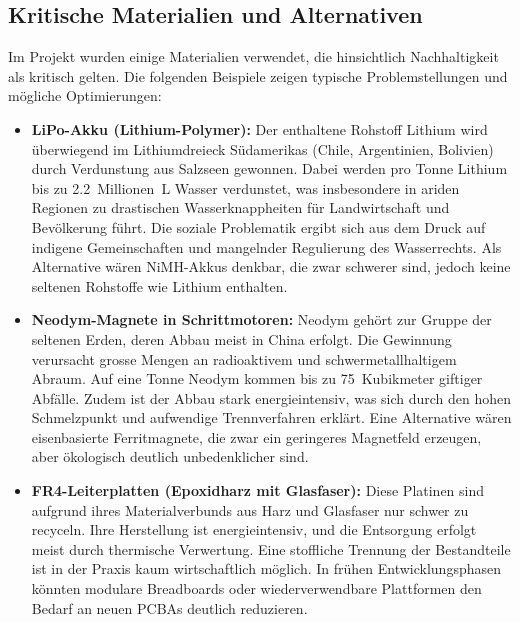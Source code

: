 \documentclass[main.tex]{subfiles} %
\begin{document}

\subsection{Kritische Materialien und Alternativen}

Im Projekt wurden einige Materialien verwendet, die hinsichtlich Nachhaltigkeit 
als kritisch gelten. Die folgenden Beispiele zeigen typische Problemstellungen 
und mögliche Optimierungen:

\begin{itemize}
    \item \textbf{LiPo-Akku (Lithium-Polymer):} 
    Der enthaltene Rohstoff Lithium wird überwiegend im Lithiumdreieck Südamerikas 
    (Chile, Argentinien, Bolivien) durch Verdunstung aus Salzseen gewonnen. Dabei 
    werden pro Tonne Lithium bis zu \SI{2.2}{Millionen\liter} Wasser verdunstet, 
    was insbesondere in ariden Regionen zu drastischen Wasserknappheiten für 
    Landwirtschaft und Bevölkerung führt. Die soziale Problematik ergibt sich aus 
    dem Druck auf indigene Gemeinschaften und mangelnder Regulierung des Wasserrechts. 
    Als Alternative wären NiMH-Akkus denkbar, die zwar schwerer sind, jedoch keine 
    seltenen Rohstoffe wie Lithium enthalten.
    
    \item \textbf{Neodym-Magnete in Schrittmotoren:} 
    Neodym gehört zur Gruppe der seltenen Erden, deren Abbau meist in China erfolgt. 
    Die Gewinnung verursacht grosse Mengen an radioaktivem und schwermetallhaltigem Abraum.
    Auf eine Tonne Neodym kommen bis zu \SI{75}{Kubikmeter} giftiger Abfälle. Zudem ist 
    der Abbau stark energieintensiv, was sich durch den hohen Schmelzpunkt und aufwendige 
    Trennverfahren erklärt. Eine Alternative wären eisenbasierte Ferritmagnete, die zwar 
    ein geringeres Magnetfeld erzeugen, aber ökologisch deutlich unbedenklicher sind.
    
    \item \textbf{FR4-Leiterplatten (Epoxidharz mit Glasfaser):} 
    Diese Platinen sind aufgrund ihres Materialverbunds aus Harz und Glasfaser nur 
    schwer zu recyceln. Ihre Herstellung ist energieintensiv, und die Entsorgung erfolgt 
    meist durch thermische Verwertung. Eine stoffliche Trennung der Bestandteile ist in 
    der Praxis kaum wirtschaftlich möglich. In frühen Entwicklungsphasen könnten modulare 
    Breadboards oder wiederverwendbare Plattformen den Bedarf an neuen PCBAs deutlich 
    reduzieren.
\end{itemize}
\end{document}
